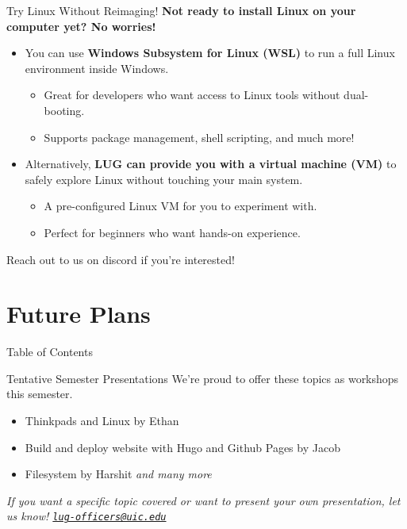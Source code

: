 \documentclass{beamer}
\begin{document}
\begin{frame}{Try Linux Without Reimaging!}
	\textbf{Not ready to install Linux on your computer yet? No worries!}
	\pause
	\begin{itemize}
		\item You can use \textbf{Windows Subsystem for Linux (WSL)} to run a full Linux environment inside Windows.
			\begin{itemize}
				\item Great for developers who want access to Linux tools without dual-booting.
				\item Supports package management, shell scripting, and much more!
			\end{itemize}
		\pause
		\item Alternatively, \textbf{LUG can provide you with a virtual machine (VM)} to safely explore Linux without touching your main system.
			\begin{itemize}
				\item A pre-configured Linux VM for you to experiment with.
				\item Perfect for beginners who want hands-on experience.
			\end{itemize}
		\pause
	\end{itemize}
	Reach out to us on discord if you're interested!
\end{frame}


\section{Future Plans}
\begin{frame}{Table of Contents}
	\tableofcontents[currentsection]
\end{frame}

\begin{frame}{Tentative Semester Presentations}
	We're proud to offer these topics as workshops this semester.
	\pause
	\begin{itemize}
		\item Thinkpads and Linux by Ethan
		\item Build and deploy website with Hugo and Github Pages by Jacob
		\item Filesystem by Harshit
        \textit{and many more}
	\end{itemize}
	\pause
	\textit{If you want a specific topic covered or want to present your
	own presentation, let us know!
	\href{mailto:lug-officers@uic.edu}{\texttt{lug-officers@uic.edu}}}
\end{frame}
\end{document}
